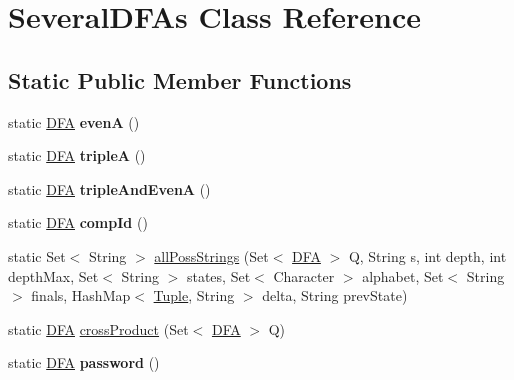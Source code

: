 \hypertarget{class_several_d_f_as}{}\section{Several\+D\+F\+As Class Reference}
\label{class_several_d_f_as}
\subsection*{Static Public Member Functions}
\begin{DoxyCompactItemize}
\item 
\mbox{\label{class_several_d_f_as_a47419a6422944b096d57eace2bd681fb}} 
static \mbox{\hyperlink{class_d_f_a}{D\+FA}} {\bfseries evenA} ()
\item 
\mbox{\label{class_several_d_f_as_acd8b269da1afd756e62bdd9b0c22f3f1}} 
static \mbox{\hyperlink{class_d_f_a}{D\+FA}} {\bfseries tripleA} ()
\item 
\mbox{\label{class_several_d_f_as_a8801e47e5711f3e1b94b0541e1d4b27e}} 
static \mbox{\hyperlink{class_d_f_a}{D\+FA}} {\bfseries triple\+And\+EvenA} ()
\item 
\mbox{\label{class_several_d_f_as_a97c2a4b571d625eec7f1dd9ee3f6fd7e}} 
static \mbox{\hyperlink{class_d_f_a}{D\+FA}} {\bfseries comp\+Id} ()
\item 
static Set$<$ String $>$ \mbox{\hyperlink{class_several_d_f_as_a43b88bc47b42d281c9169bf7b1377f6a}{all\+Poss\+Strings}} (Set$<$ \mbox{\hyperlink{class_d_f_a}{D\+FA}} $>$ Q, String s, int depth, int depth\+Max, Set$<$ String $>$ states, Set$<$ Character $>$ alphabet, Set$<$ String $>$ finals, Hash\+Map$<$ \mbox{\hyperlink{class_tuple}{Tuple}}, String $>$ delta, String prev\+State)
\item 
static \mbox{\hyperlink{class_d_f_a}{D\+FA}} \mbox{\hyperlink{class_several_d_f_as_a63696c729a39776ec96a15c0cf711ede}{cross\+Product}} (Set$<$ \mbox{\hyperlink{class_d_f_a}{D\+FA}} $>$ Q)
\item 
\mbox{\label{class_several_d_f_as_aa1c5efae655ccc4cd9e5239503b3b17d}} 
static \mbox{\hyperlink{class_d_f_a}{D\+FA}} {\bfseries password} ()
\item 
\mbox{\label{class_several_d_f_as_aa144dba9cb2576cd0819681020ae4bc0}} 

\end{DoxyCompactItemize}
